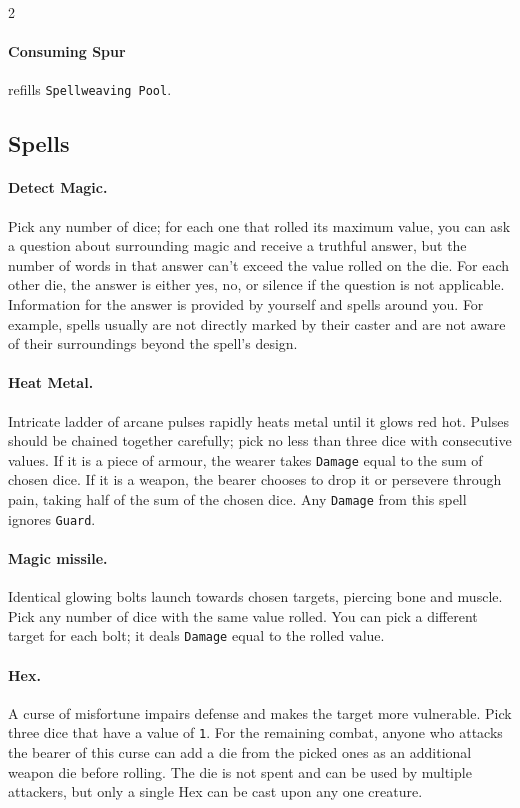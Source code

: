 \documentclass{osr-template/zine}
\begin{document}
\begin{multicols*}{2}
\paragraph{Consuming Spur} refills \texttt{Spellweaving Pool}.

\subsection*{Spells}

\paragraph*{Detect Magic.}

Pick any number of dice; for each one that rolled its maximum value, you can ask a question about surrounding magic and receive a truthful answer, but the number of words in that answer can't exceed the value rolled on the die.
For each other die, the answer is either yes, no, or silence if the question is not applicable.
Information for the answer is provided by yourself and spells around you.
For example, spells usually are not directly marked by their caster and are not aware of their surroundings beyond the spell's design.

\paragraph{Heat Metal.} Intricate ladder of arcane pulses rapidly heats metal until it glows red hot.
Pulses should be chained together carefully; pick no less than three dice with consecutive values.
If it is a piece of armour, the wearer takes \texttt{Damage} equal to the sum of chosen dice.
If it is a weapon, the bearer chooses to drop it or persevere through pain, taking half of the sum of the chosen dice.
Any \texttt{Damage} from this spell ignores \texttt{Guard}.

\paragraph{Magic missile.}
Identical glowing bolts launch towards chosen targets, piercing bone and muscle.
Pick any number of dice with the same value rolled.
You can pick a different target for each bolt; it deals \texttt{Damage} equal to the rolled value.

\paragraph{Hex.}
A curse of misfortune impairs defense and makes the target more vulnerable.
Pick three dice that have a value of \texttt{1}.
For the remaining combat, anyone who attacks the bearer of this curse can add a die from the picked ones as an additional weapon die before rolling.
The die is not spent and can be used by multiple attackers, but only a single Hex can be cast upon any one creature.


\end{multicols*}
\end{document}
